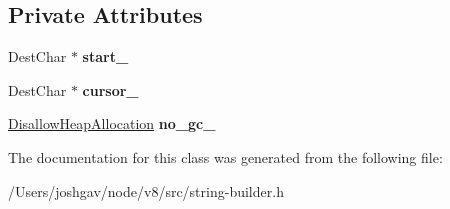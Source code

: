 \subsection*{Private Attributes}
\begin{DoxyCompactItemize}
\item 
Dest\+Char $\ast$ {\bfseries start\+\_\+}\hypertarget{classv8_1_1internal_1_1_incremental_string_builder_1_1_no_extend_abced93c40b086941578903fd74846f2c}{}\label{classv8_1_1internal_1_1_incremental_string_builder_1_1_no_extend_abced93c40b086941578903fd74846f2c}

\item 
Dest\+Char $\ast$ {\bfseries cursor\+\_\+}\hypertarget{classv8_1_1internal_1_1_incremental_string_builder_1_1_no_extend_a02c6bfe045ce7622f736954ff46eae7d}{}\label{classv8_1_1internal_1_1_incremental_string_builder_1_1_no_extend_a02c6bfe045ce7622f736954ff46eae7d}

\item 
\hyperlink{classv8_1_1internal_1_1_per_thread_assert_scope_debug_only}{Disallow\+Heap\+Allocation} {\bfseries no\+\_\+gc\+\_\+}\hypertarget{classv8_1_1internal_1_1_incremental_string_builder_1_1_no_extend_ab2aff2ffd3a2487957f482e8d609f442}{}\label{classv8_1_1internal_1_1_incremental_string_builder_1_1_no_extend_ab2aff2ffd3a2487957f482e8d609f442}

\end{DoxyCompactItemize}


The documentation for this class was generated from the following file\+:\begin{DoxyCompactItemize}
\item 
/\+Users/joshgav/node/v8/src/string-\/builder.\+h\end{DoxyCompactItemize}

